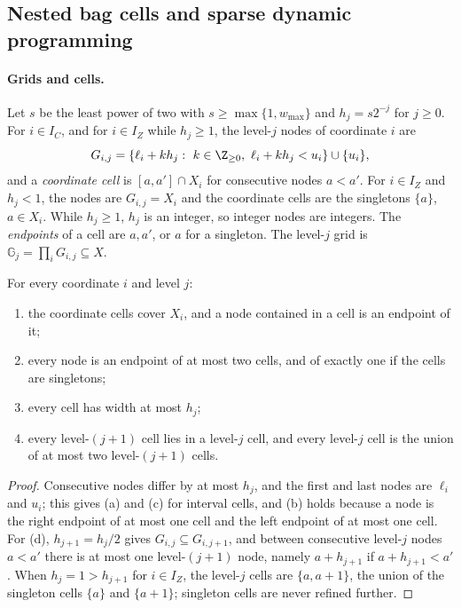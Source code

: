 \subsection{Nested bag cells and sparse dynamic programming}\label{sec:sp:cells}

\paragraph{Grids and cells.}
Let $s$ be the least power of two with $s\ge\max\{1,w_{\max}\}$ and
$h_j=s2^{-j}$ for $j\ge0$. For $i\in I_C$, and for $i\in I_Z$ while
$h_j\ge1$, the level-$j$ nodes of coordinate $i$ are
\[
 G_{i,j}=\{\ell_i+kh_j:\ k\in\Z_{\ge0},\ \ell_i+kh_j<u_i\}\cup\{u_i\},
\]
and a \emph{coordinate cell} is $[a,a']\cap X_i$ for consecutive nodes
$a<a'$. For $i\in I_Z$ and $h_j<1$, the nodes are $G_{i,j}=X_i$ and the
coordinate cells are the singletons $\{a\}$, $a\in X_i$. While $h_j\ge1$,
$h_j$ is an integer, so integer nodes are integers. The \emph{endpoints} of
a cell are $a,a'$, or $a$ for a singleton. The level-$j$ grid is
$\mathbb G_j=\prod_iG_{i,j}\subseteq X$.

\begin{lemma}\label{lem:sp:cells}
For every coordinate $i$ and level $j$:
\begin{enumerate}[label=(\alph*)]
\item the coordinate cells cover $X_i$, and a node contained in a cell is an
endpoint of it;
\item every node is an endpoint of at most two cells, and of exactly one if
the cells are singletons;
\item every cell has width at most $h_j$;
\item every level-$(j+1)$ cell lies in a level-$j$ cell, and every level-$j$
cell is the union of at most two level-$(j+1)$ cells.
\end{enumerate}
\end{lemma}

\begin{proof}
Consecutive nodes differ by at most $h_j$, and the first and last nodes are
$\ell_i$ and $u_i$; this gives (a) and (c) for interval cells, and (b) holds
because a node is the right endpoint of at most one cell and the left
endpoint of at most one cell. For (d), $h_{j+1}=h_j/2$ gives
$G_{i,j}\subseteq G_{i,j+1}$, and between consecutive level-$j$ nodes
$a<a'$ there is at most one level-$(j+1)$ node, namely $a+h_{j+1}$ if
$a+h_{j+1}<a'$. When $h_j=1>h_{j+1}$ for $i\in I_Z$, the level-$j$ cells
are $\{a,a+1\}$, the union of the singleton cells $\{a\}$ and $\{a+1\}$;
singleton cells are never refined further.
\end{proof}

